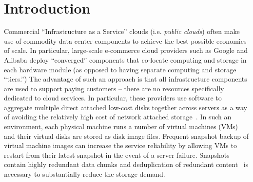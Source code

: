 \section{Introduction}

Commercial ``Infrastructure as a Service'' clouds (i.e. {\em public
clouds}) often make use of commodity data center components to achieve the
best possible economies of scale.  In particular, large-scale e-commerce cloud
providers such as Google and Alibaba deploy ``converged'' components that
co-locate computing and storage in each hardware module (as opposed to having
separate computing and storage ``tiers.'')  The advantage of such an approach
is that all infrastructure components are used to support paying customers --
there are no resources specifically dedicated to cloud services.
In particular, these providers use software to
aggregate multiple direct attached low-cost disks together across
servers as a way of avoiding the relatively high cost of network attached 
storage~\cite{googlefs03,hdfs10,NutanixPaper}.
In such an environment,
each physical machine runs a number of virtual machines (VMs)
and their virtual disks are stored as disk image files.
Frequent snapshot backup of virtual machine images can
increase the service reliability by allowing VMs to restart from their latest
snapshot in the event of a server failure. Snapshots contain highly redundant 
data chunks and 
deduplication of redundant 
content~\cite{venti02,bottleneck08} is necessary to substantially reduce the
storage demand. 


